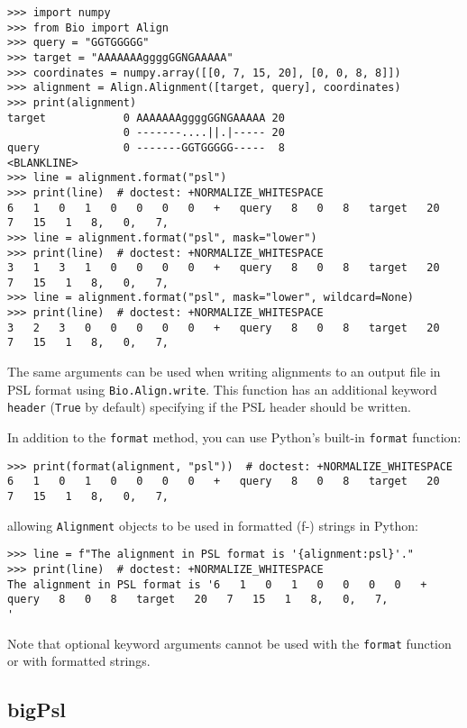 \begin{verbatim}
>>> import numpy
>>> from Bio import Align
>>> query = "GGTGGGGG"
>>> target = "AAAAAAAggggGGNGAAAAA"
>>> coordinates = numpy.array([[0, 7, 15, 20], [0, 0, 8, 8]])
>>> alignment = Align.Alignment([target, query], coordinates)
>>> print(alignment)
target            0 AAAAAAAggggGGNGAAAAA 20
                  0 -------....||.|----- 20
query             0 -------GGTGGGGG-----  8
<BLANKLINE>
>>> line = alignment.format("psl")
>>> print(line)  # doctest: +NORMALIZE_WHITESPACE
6   1   0   1   0   0   0   0   +   query   8   0   8   target   20   7   15   1   8,   0,   7,
>>> line = alignment.format("psl", mask="lower")
>>> print(line)  # doctest: +NORMALIZE_WHITESPACE
3   1   3   1   0   0   0   0   +   query   8   0   8   target   20   7   15   1   8,   0,   7,
>>> line = alignment.format("psl", mask="lower", wildcard=None)
>>> print(line)  # doctest: +NORMALIZE_WHITESPACE
3   2   3   0   0   0   0   0   +   query   8   0   8   target   20   7   15   1   8,   0,   7,
\end{verbatim}
The same arguments can be used when writing alignments to an output file in PSL format using \verb|Bio.Align.write|. This function has an additional keyword \verb|header| (\verb|True| by default) specifying if the PSL header should be written.

In addition to the \verb+format+ method, you can use Python's built-in \verb+format+ function:
\begin{verbatim}
>>> print(format(alignment, "psl"))  # doctest: +NORMALIZE_WHITESPACE
6   1   0   1   0   0   0   0   +   query   8   0   8   target   20   7   15   1   8,   0,   7,
\end{verbatim}
allowing \verb+Alignment+ objects to be used in formatted (f-) strings in Python:
\begin{verbatim}
>>> line = f"The alignment in PSL format is '{alignment:psl}'."
>>> print(line)  # doctest: +NORMALIZE_WHITESPACE
The alignment in PSL format is '6   1   0   1   0   0   0   0   +   query   8   0   8   target   20   7   15   1   8,   0,   7,
'
\end{verbatim}
Note that optional keyword arguments cannot be used with the \verb+format+ function or with formatted strings.

\subsection{bigPsl}
\label{subsec:align_bigpsl}

